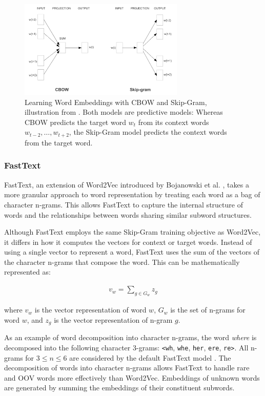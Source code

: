 \begin{figure}[ht]
    \centering
    \includegraphics[width=0.7\textwidth]{screenshots/cbow_skipgram.png}
    \caption[\acl{CBOW} vs. Skip-Gram]{Learning Word Embeddings with \ac{CBOW} and Skip-Gram, illustration from \cite{MikolovEfficientEstimation2013}.
        Both models are predictive models: Whereas \ac{CBOW} predicts the target word $w_t$ from its context words $w_{t-2}, \dots, w_{t+2}$, the Skip-Gram model predicts the context words from the target word.}
    \label{fig:cbow-skipgram}
\end{figure}


\subsubsection*{FastText}

FastText, an extension of Word2Vec introduced by Bojanowski et al. \cite{BojanowskiEnrichingWord2017}, takes a more granular approach to word representation by treating each word as a bag of character n-grams. This allows FastText to capture the internal structure of words and the relationships between words sharing similar subword structures.

Although FastText employs the same Skip-Gram training objective as Word2Vec, it differs in how it computes the vectors for context or target words. Instead of using a single vector to represent a word, FastText uses the sum of the vectors of the character n-grams that compose the word. This can be mathematically represented as:

\begin{align}
    v_w = \sum_{g \in G_w} z_g \label{eq:fasttext}
\end{align}

where $v_w$ is the vector representation of word $w$, $G_w$ is the set of n-grams for word $w$, and $z_g$ is the vector representation of n-gram $g$.

As an example of word decomposition into character n-grams, the word \emph{where} is decomposed into the following character 3-grams: \texttt{<wh}, \texttt{whe}, \texttt{her}, \texttt{ere}, \texttt{re>}.
All n-grams for $3 \leq n \leq 6$ are considered by the default FastText model \cite{BojanowskiEnrichingWord2017}.
The decomposition of words into character n-grams allows FastText to handle rare and \ac{OOV} words more effectively than Word2Vec. Embeddings of unknown words are generated by summing the embeddings of their constituent subwords.


